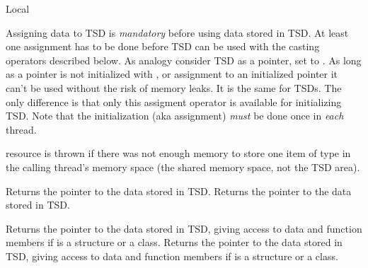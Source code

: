 \begin{classpage}{Local}
\begin{mandescription}
  Assigning data to  TSD is \emph{mandatory} before using
  data stored in  TSD. At least one assignment has to be
  done before  TSD can be used with the casting operators
  described below.  As analogy consider  TSD as a pointer,
  set to . As long as a pointer is not initialized with
  ,  or assignment to an initialized pointer it
  can't be used without the risk of memory leaks. It is the same for
  TSDs. The only difference is that only this assigment operator is
  available for initializing  TSD. Note that the
  initialization (aka assignment) \emph{must} be done once in
  \emph{each} thread.

  \begin{exception}
    \item[resource] is thrown if there was not enough
      memory to store one item of type  in the calling
      thread's memory space (the shared memory space, not the TSD
      area).
  \end{exception}

  Returns the pointer to the data stored in  TSD.
  Returns the pointer to the data stored in  TSD.

  Returns the pointer to the data stored in  TSD, giving
  access to data and function members if  is a structure or a
  class.
  Returns the pointer to the data stored in  TSD, giving
  access to data and function members if  is a structure or a
  class.

\end{mandescription}

\end{classpage}
